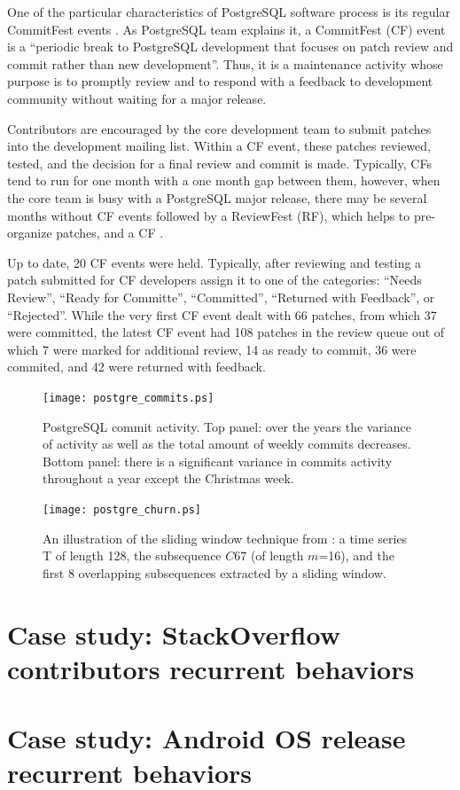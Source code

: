 One of the particular characteristics of PostgreSQL software process is its regular CommitFest events \cite{postgre-commitfest}.
As PostgreSQL team explains it, a CommitFest (CF) event is a ``periodic break to PostgreSQL development that focuses on patch 
review and commit rather than new development''.  Thus, it is a maintenance activity whose purpose is to promptly review 
and to respond with a feedback to development community without waiting for a major release. 

Contributors are encouraged by the core development team to submit patches into the development mailing list. Within a CF event, 
these patches reviewed, tested, and the decision for a final review and commit is made.  Typically, CFs tend to run for one month 
with a one month gap between them, however, when the core team is busy with a PostgreSQL major release, there may be several 
months without CF events followed by a ReviewFest (RF), which helps to pre-organize patches, and a CF . 

Up to date, 20 CF events were held. Typically, after reviewing and testing a patch submitted for CF developers assign it to one of the 
categories: ``Needs Review'', ``Ready for Committe'', ``Committed'', ``Returned with Feedback'', or ``Rejected''. 
While the very first CF event dealt with 66 patches, from which 37 were committed, the latest CF event had 108 patches in the review 
queue out of which 7 were marked for additional review, 14 as ready to commit, 36 were commited, and 42 were returned with feedback.

\begin{figure}[h]
   \centering
   \texttt{[image: postgre\_commits.ps]}
   \caption{PostgreSQL commit activity. Top panel: over the years the variance of activity as well as the total amount of weekly commits decreases.
   Bottom panel: there is a significant variance in commits activity throughout a year except the Christmas week.}
   \label{fig:postgre_commits}
\end{figure}

\begin{figure}[h]
   \centering
   \texttt{[image: postgre\_churn.ps]}
   \caption{An illustration of the sliding window technique from \cite{citeulike:2821475}: a time series T of length 128, 
   the subsequence $C67$ (of length $m$=16), and the first 8 overlapping subsequences extracted by a sliding window.}
   \label{fig:postgre_churn}
\end{figure}



\section{Case study: StackOverflow contributors recurrent behaviors}
\section{Case study: Android OS release recurrent behaviors}

